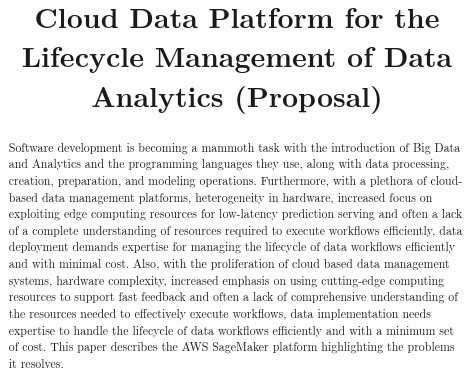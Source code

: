 \documentclass[conference]{IEEEtran}
\begin{document}
%
\title{Cloud Data Platform for the Lifecycle Management of Data Analytics (Proposal) }


\author{
	\and

}

\maketitle{}

\begin{abstract}
Software development is becoming a mammoth task with the introduction of Big Data and Analytics and the programming languages they use, along with data processing, creation, preparation,  and modeling operations.  Furthermore, with a plethora of cloud-based data management platforms, heterogeneity in hardware, increased focus on exploiting edge computing resources for low-latency prediction serving and often a lack of a complete understanding of resources required to execute workflows efficiently, data deployment demands expertise for managing the lifecycle of data workflows efficiently and with minimal cost. Also, with the proliferation of cloud based data management systems, hardware complexity, increased emphasis on using cutting-edge computing resources to support fast feedback and often a lack of comprehensive understanding of the resources needed to effectively execute workflows, data implementation needs expertise to handle the lifecycle of data workflows efficiently and with a minimum set of cost.  This paper describes the AWS SageMaker platform highlighting the problems it resolves.

\end{abstract}
\end{document}

